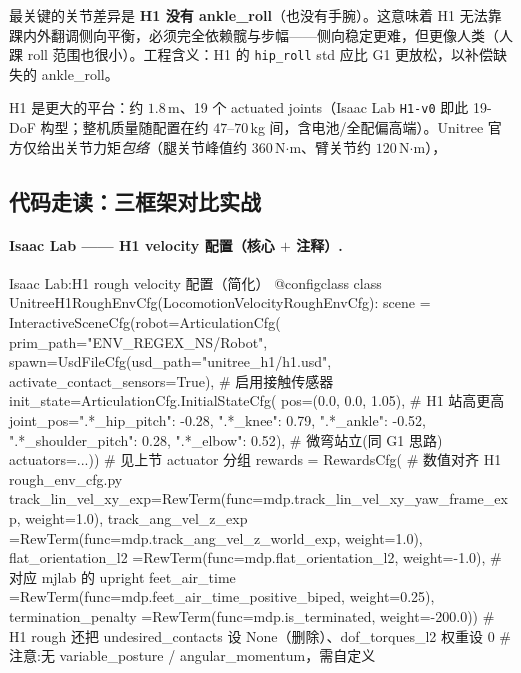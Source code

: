 最关键的关节差异是 \textbf{H1 没有 ankle\_roll}（也没有手腕）。这意味着 H1 无法靠踝内外翻调侧向平衡，必须完全依赖髋与步幅——侧向稳定更难，但更像人类（人踝 roll 范围也很小）。工程含义：H1 的 \texttt{hip\_roll} std 应比 G1 更放松，以补偿缺失的 ankle\_roll。

H1 是更大的平台：约 $1.8$\,m、19 个 actuated joints（Isaac Lab \texttt{H1-v0} 即此 19-DoF 构型；整机质量随配置在约 $47$--$70$\,kg 间，含电池/全配偏高端）。Unitree 官方仅给出关节力矩\emph{包络}（腿关节峰值约 $360$\,N$\cdot$m、臂关节约 $120$\,N$\cdot$m），

\subsection{代码走读：三框架对比实战}

\paragraph{Isaac Lab —— H1 velocity 配置（核心 $+$ 注释）.}

\begin{codebox}[Python]{Isaac Lab:H1 rough velocity 配置（简化）}
@configclass
class UnitreeH1RoughEnvCfg(LocomotionVelocityRoughEnvCfg):
    scene = InteractiveSceneCfg(robot=ArticulationCfg(
        prim_path="{ENV_REGEX_NS}/Robot",
        spawn=UsdFileCfg(usd_path="unitree_h1/h1.usd",
                         activate_contact_sensors=True),   # 启用接触传感器
        init_state=ArticulationCfg.InitialStateCfg(
            pos=(0.0, 0.0, 1.05),                          # H1 站高更高
            joint_pos={".*_hip_pitch": -0.28, ".*_knee": 0.79,
                       ".*_ankle": -0.52, ".*_shoulder_pitch": 0.28,
                       ".*_elbow": 0.52}),                 # 微弯站立(同 G1 思路)
        actuators={...}))                                  # 见上节 actuator 分组
    rewards = RewardsCfg(                              # 数值对齐 H1 rough_env_cfg.py
        track_lin_vel_xy_exp=RewTerm(func=mdp.track_lin_vel_xy_yaw_frame_exp, weight=1.0),
        track_ang_vel_z_exp =RewTerm(func=mdp.track_ang_vel_z_world_exp,      weight=1.0),
        flat_orientation_l2 =RewTerm(func=mdp.flat_orientation_l2, weight=-1.0),  # 对应 mjlab 的 upright
        feet_air_time       =RewTerm(func=mdp.feet_air_time_positive_biped, weight=0.25),
        termination_penalty =RewTerm(func=mdp.is_terminated, weight=-200.0))
        # H1 rough 还把 undesired_contacts 设 None（删除）、dof_torques_l2 权重设 0
        # 注意:无 variable_posture / angular_momentum，需自定义
\end{codebox}

